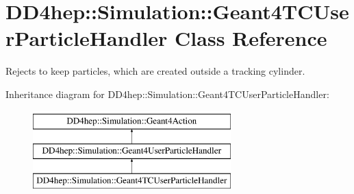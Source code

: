 \hypertarget{class_d_d4hep_1_1_simulation_1_1_geant4_t_c_user_particle_handler}{}\section{D\+D4hep\+:\+:Simulation\+:\+:Geant4\+T\+C\+User\+Particle\+Handler Class Reference}
\label{class_d_d4hep_1_1_simulation_1_1_geant4_t_c_user_particle_handler}


Rejects to keep particles, which are created outside a tracking cylinder.  


Inheritance diagram for D\+D4hep\+:\+:Simulation\+:\+:Geant4\+T\+C\+User\+Particle\+Handler\+:\begin{figure}[H]
\begin{center}
\leavevmode
\includegraphics[height=3.000000cm]{class_d_d4hep_1_1_simulation_1_1_geant4_t_c_user_particle_handler}
\end{center}
\end{figure}
